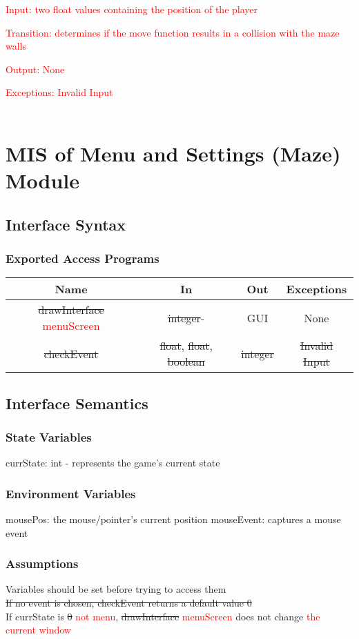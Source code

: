 \documentclass[12pt, titlepage]{article}
\begin{document}
		\textcolor{red}{Input: two float values containing the position of the player}
		
		\textcolor{red}{Transition: determines if the move function results in a collision with the maze walls}
		
		\textcolor{red}{Output: None}
		
		\textcolor{red}{Exceptions: Invalid Input}\\
        \\
\section{MIS of Menu and Settings (Maze) Module}
		\subsection{Interface Syntax}
		\subsubsection{Exported Access Programs}
		\begin{tabular}[pos]{|c|c|c|c|}
			\hline
			\textbf{Name}& \textbf{In} & \textbf{Out} & \textbf{Exceptions} \\ \hline
		    \sout{drawInterface} \textcolor{red}{menuScreen} & \sout{integer}\textcolor{red}{-} & GUI & None \\ \hline
			\sout{checkEvent} & \sout{float}, \sout{float}, \sout{boolean} & \sout{integer} & \sout{Invalid Input} \\ \hline
			
		\end{tabular}
		
		\subsection{Interface Semantics}
		\subsubsection{State Variables}
		currState: int - represents the game's current state
		
		\subsubsection{Environment Variables}
		mousePos: the mouse/pointer's current position
		mouseEvent: captures a mouse event 
		\subsubsection{Assumptions}
		Variables should be set before trying to access them \\ 
		\sout{If no event is chosen, checkEvent returns a default value 0} \\
		If currState is \sout{0} \textcolor{red}{not menu}, \sout{drawInterface} \textcolor{red}{menuScreen} does not change \textcolor{red}{the current window} \\
		
\end{document}
